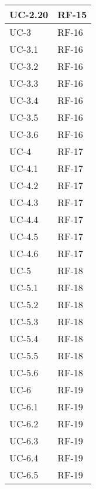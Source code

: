 \begin{longtable}{|>{\centering\arraybackslash}m{}|>{\centering\arraybackslash}m{}|}
	UC-2.20             & RF-15                   \\\hline
	UC-3                & RF-16                   \\\hline
	UC-3.1              & RF-16                   \\\hline
	UC-3.2              & RF-16                   \\\hline
	UC-3.3              & RF-16                   \\\hline
	UC-3.4              & RF-16                   \\\hline
	UC-3.5              & RF-16                   \\\hline
	UC-3.6              & RF-16                   \\\hline
	UC-4                & RF-17                   \\\hline
	UC-4.1              & RF-17                   \\\hline
	UC-4.2              & RF-17                   \\\hline
	UC-4.3              & RF-17                   \\\hline
	UC-4.4              & RF-17                   \\\hline
	UC-4.5              & RF-17                   \\\hline
	UC-4.6              & RF-17                   \\\hline
	UC-5                & RF-18                   \\\hline
	UC-5.1              & RF-18                   \\\hline
	UC-5.2              & RF-18                   \\\hline
	UC-5.3              & RF-18                   \\\hline
	UC-5.4              & RF-18                   \\\hline
	UC-5.5              & RF-18                   \\\hline
	UC-5.6              & RF-18                   \\\hline
	UC-6                & RF-19                   \\\hline
	UC-6.1              & RF-19                   \\\hline
	UC-6.2              & RF-19                   \\\hline
	UC-6.3              & RF-19                   \\\hline
	UC-6.4              & RF-19                   \\\hline
	UC-6.5              & RF-19                   \\\hline

\end{longtable}
